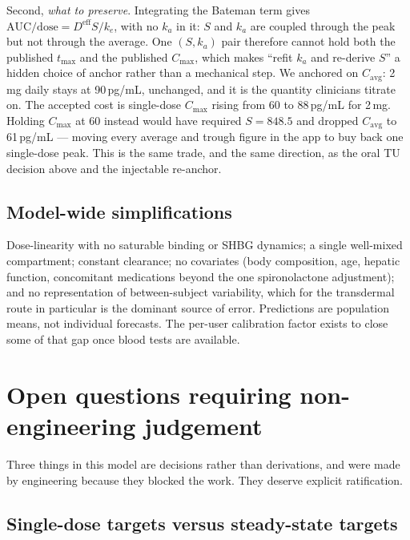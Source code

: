 \documentclass[11pt,a4paper]{article}
\begin{document}
Second, \emph{what to preserve}. Integrating the Bateman term gives
$\mathrm{AUC}/\text{dose} = D^{\mathrm{eff}} S / k_e$, with no $k_a$ in it: $S$
and $k_a$ are coupled through the peak but not through the average. One
$(S, k_a)$ pair therefore cannot hold both the published $t_{\max}$ and the
published $C_{\max}$, which makes ``refit $k_a$ and re-derive $S$'' a hidden
choice of anchor rather than a mechanical step. We anchored on
$C_{\mathrm{avg}}$: 2\,mg daily stays at 90\,pg/mL, unchanged, and it is the
quantity clinicians titrate on. The accepted cost is single-dose $C_{\max}$
rising from 60 to 88\,pg/mL for 2\,mg. Holding $C_{\max}$ at 60 instead would
have required $S = 848.5$ and dropped $C_{\mathrm{avg}}$ to 61\,pg/mL --- moving
every average and trough figure in the app to buy back one single-dose peak. This
is the same trade, and the same direction, as the oral TU decision above and the
injectable re-anchor.

\subsection{Model-wide simplifications}

Dose-linearity with no saturable binding or SHBG dynamics; a single well-mixed
compartment; constant clearance; no covariates (body composition, age, hepatic
function, concomitant medications beyond the one spironolactone adjustment); and
no representation of between-subject variability, which for the transdermal route
in particular is the dominant source of error. Predictions are population means,
not individual forecasts. The per-user calibration factor exists to close some of
that gap once blood tests are available.

\section{Open questions requiring non-engineering judgement}
\label{sec:openquestions}

Three things in this model are decisions rather than derivations, and were made by
engineering because they blocked the work. They deserve explicit ratification.

\subsection{Single-dose targets versus steady-state targets}
\end{document}
